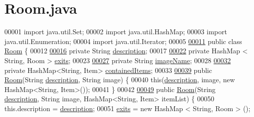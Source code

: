 \hypertarget{Room_8java_source}{\section{Room.\-java}
}

\begin{DoxyCode}
00001 \textcolor{keyword}{import} java.util.Set;
00002 \textcolor{keyword}{import} java.util.HashMap;
00003 \textcolor{keyword}{import} java.util.Enumeration;
00004 \textcolor{keyword}{import} java.util.Iterator;
00005 
\hypertarget{Room_8java_source_l00011}{}\hyperlink{classRoom}{00011} \textcolor{keyword}{public} \textcolor{keyword}{class }\hyperlink{classRoom}{Room} \{
00012 
\hypertarget{Room_8java_source_l00016}{}\hyperlink{classRoom_a2d7ecf802690a6b13750ca6fa6882d77}{00016}     \textcolor{keyword}{private} String \hyperlink{classRoom_a2d7ecf802690a6b13750ca6fa6882d77}{description};
00017 
\hypertarget{Room_8java_source_l00022}{}\hyperlink{classRoom_ae2a85f60f11d82f6222a926b1a22d05d}{00022}     \textcolor{keyword}{private} HashMap < String, Room > \hyperlink{classRoom_ae2a85f60f11d82f6222a926b1a22d05d}{exits};
00023 
\hypertarget{Room_8java_source_l00027}{}\hyperlink{classRoom_a3ddf7c120b54509c43d803d2409158fc}{00027}     \textcolor{keyword}{private} String \hyperlink{classRoom_a3ddf7c120b54509c43d803d2409158fc}{imageName};
00028 
\hypertarget{Room_8java_source_l00032}{}\hyperlink{classRoom_a16464067daeb7e4ad55ca03edae0ffe8}{00032}     \textcolor{keyword}{private} HashMap<String, Item> \hyperlink{classRoom_a16464067daeb7e4ad55ca03edae0ffe8}{containedItems};
00033 
\hypertarget{Room_8java_source_l00039}{}\hyperlink{classRoom_a2cdcbb3d86746330a5a01c7fae4de02c}{00039}     \textcolor{keyword}{public} \hyperlink{classRoom_a2cdcbb3d86746330a5a01c7fae4de02c}{Room}(String \hyperlink{classRoom_a2d7ecf802690a6b13750ca6fa6882d77}{description}, String image) \{
00040         \textcolor{keyword}{this}(\hyperlink{classRoom_a2d7ecf802690a6b13750ca6fa6882d77}{description}, image, \textcolor{keyword}{new} HashMap<String, Item>());
00041     \}
00042 
\hypertarget{Room_8java_source_l00049}{}\hyperlink{classRoom_a05e162f8831368304aa193ad5a05750c}{00049}     \textcolor{keyword}{public} \hyperlink{classRoom_a05e162f8831368304aa193ad5a05750c}{Room}(String \hyperlink{classRoom_a2d7ecf802690a6b13750ca6fa6882d77}{description}, String image, HashMap<String, Item> itemList) \{
00050         this.description = \hyperlink{classRoom_a2d7ecf802690a6b13750ca6fa6882d77}{description};
00051         \hyperlink{classRoom_ae2a85f60f11d82f6222a926b1a22d05d}{exits} = \textcolor{keyword}{new} HashMap < String, Room > ();

\end{DoxyCode}
